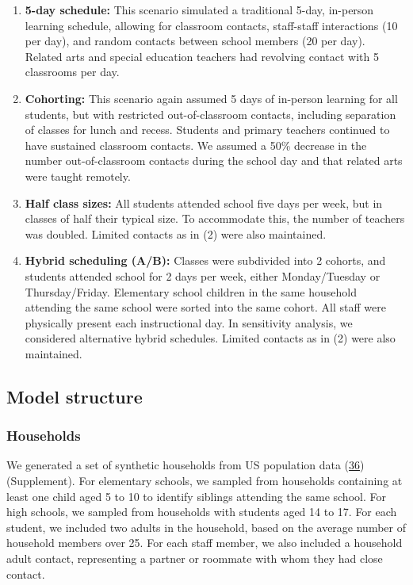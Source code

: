 \documentclass[
]{article}
\providecommand{\tightlist}{%
  \setlength{\itemsep}{0pt}\setlength{\parskip}{0pt}}
\begin{document}
\begin{enumerate}
\def\labelenumi{\arabic{enumi}.}
\tightlist
\item
  \textbf{5-day schedule:} This scenario simulated a traditional 5-day,
  in-person learning schedule, allowing for classroom contacts,
  staff-staff interactions (10 per day), and random contacts between
  school members (20 per day). Related arts and special education
  teachers had revolving contact with 5 classrooms per day.
\item
  \textbf{Cohorting:} This scenario again assumed 5 days of in-person
  learning for all students, but with restricted out-of-classroom
  contacts, including separation of classes for lunch and recess.
  Students and primary teachers continued to have sustained classroom
  contacts. We assumed a 50\% decrease in the number out-of-classroom
  contacts during the school day and that related arts were taught
  remotely.
\item
  \textbf{Half class sizes:} All students attended school five days per
  week, but in classes of half their typical size. To accommodate this,
  the number of teachers was doubled. Limited contacts as in (2) were
  also maintained.
\item
  \textbf{Hybrid scheduling (A/B):} Classes were subdivided into 2
  cohorts, and students attended school for 2 days per week, either
  Monday/Tuesday or Thursday/Friday. Elementary school children in the
  same household attending the same school were sorted into the same
  cohort. All staff were physically present each instructional day. In
  sensitivity analysis, we considered alternative hybrid schedules.
  Limited contacts as in (2) were also maintained.
\end{enumerate}

\hypertarget{model-structure}{%
\subsection{Model structure}\label{model-structure}}

\hypertarget{households}{%
\subsubsection{Households}\label{households}}

We generated a set of synthetic households from US population data
(\protect\hyperlink{ref-wheaton_us_2014}{36}) (Supplement). For
elementary schools, we sampled from households containing at least one
child aged 5 to 10 to identify siblings attending the same school. For
high schools, we sampled from households with students aged 14 to 17.
For each student, we included two adults in the household, based on the
average number of household members over 25. For each staff member, we
also included a household adult contact, representing a partner or
roommate with whom they had close contact.
\end{document}
